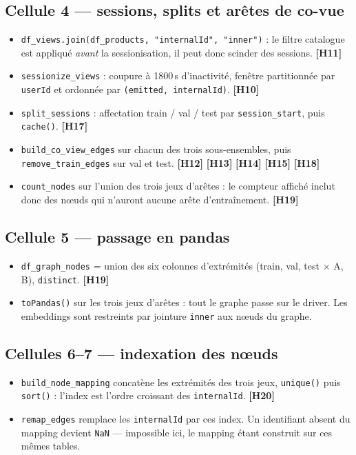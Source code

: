 \documentclass[11pt,a4paper]{article}
\newcommand{\code}[1]{\texttt{\small #1}}
\newcommand{\hyp}[1]{\textcolor{hypcol}{\textbf{\small [#1]}}}
\newcommand{\cell}[1]{\textbf{Cellule #1}}
\begin{document}
\subsection*{\cell{4} --- sessions, splits et arêtes de co-vue}
\begin{itemize}[nosep,leftmargin=*]
  \item \code{df\_views.join(df\_products, "internalId", "inner")} : le filtre
        catalogue est appliqué \emph{avant} la sessionisation, il peut donc scinder
        des sessions. \hyp{H11}
  \item \code{sessionize\_views} : coupure à 1800\,s d'inactivité, fenêtre
        partitionnée par \code{userId} et ordonnée par
        \code{(emitted, internalId)}. \hyp{H10}
  \item \code{split\_sessions} : affectation train / val / test par
        \code{session\_start}, puis \code{cache()}. \hyp{H17}
  \item \code{build\_co\_view\_edges} sur chacun des trois sous-ensembles, puis
        \code{remove\_train\_edges} sur val et test.
        \hyp{H12} \hyp{H13} \hyp{H14} \hyp{H15} \hyp{H18}
  \item \code{count\_nodes} sur l'union des trois jeux d'arêtes : le compteur affiché
        inclut donc des nœuds qui n'auront aucune arête d'entraînement. \hyp{H19}
\end{itemize}

\subsection*{\cell{5} --- passage en pandas}
\begin{itemize}[nosep,leftmargin=*]
  \item \code{df\_graph\_nodes} = union des six colonnes d'extrémités
        (train, val, test $\times$ A, B), \code{distinct}. \hyp{H19}
  \item \code{toPandas()} sur les trois jeux d'arêtes : tout le graphe passe sur le
        driver. Les embeddings sont restreints par jointure \code{inner} aux nœuds du
        graphe.
\end{itemize}

\subsection*{Cellules 6--7 --- indexation des nœuds}
\begin{itemize}[nosep,leftmargin=*]
  \item \code{build\_node\_mapping} concatène les extrémités des trois jeux,
        \code{unique()} puis \code{sort()} : l'index est l'ordre croissant des
        \code{internalId}. \hyp{H20}
  \item \code{remap\_edges} remplace les \code{internalId} par ces index. Un
        identifiant absent du mapping devient \code{NaN} --- impossible ici, le
        mapping étant construit sur ces mêmes tables.
\end{itemize}
\end{document}
